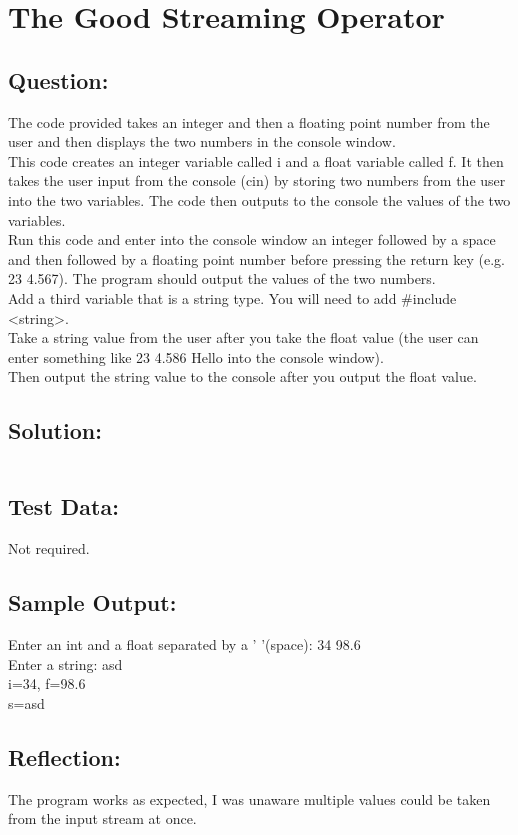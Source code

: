 \documentclass[Lab-B.tex]{subfiles}
\begin{document}
    \section{The Good Streaming Operator}
        \subsection*{Question:}
        The code provided takes an integer and then a floating point number from the user and then displays the two numbers in the console window. \\
        
        This code creates an integer variable called i and a float variable called f. 
        It then takes the user input from the console (cin) by storing two numbers from the user into the two variables. 
        The code then outputs to the console the values of the two variables. \\
        
        Run this code and enter into the console window an integer followed by a space and then followed by a floating point number before pressing the return key (e.g. 23  4.567). 
        The program should output the values of the two numbers.\\

        Add a third variable that is a string type. You will need to add \#include <string>.\\

        Take a string value from the user after you take the float value (the user can enter something like 23  4.586  Hello into the console window).\\

        Then output the string value to the console after you output the float value.\\
            
        \subsection*{Solution:}
            \inputminted{cpp}{../01-Good-Streaming/Good-Streaming.cpp}%

        \subsection*{Test Data:}
            Not required.
        
        \subsection*{Sample Output:}
            Enter an int and a float separated by a ' '(space): 34 98.6\\
            Enter a string: asd\\
            i=34, f=98.6\\
            s=asd\\      

        \subsection*{Reflection:}
            The program works as expected, I was unaware multiple values could be taken
            from the input stream at once.
\end{document}
